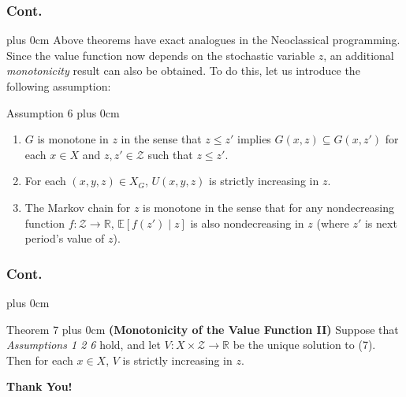 \documentclass[10pt]{beamer}
\renewcommand{\raggedright}{\leftskip=0pt \rightskip=0pt plus 0cm}
\begin{document}
\begin{frame}[c]\frametitle{Cont.}
		\raggedright
  Above theorems have exact analogues in the Neoclassical programming. Since the value function now depends
on the stochastic variable $z$, an additional \textit{monotonicity} result can also be obtained. To do this, let us introduce the following assumption:
\begin{block}{Assumption 6}
\raggedright
\begin{enumerate}
    \item \( G \) is monotone in \( z \) in the sense that \( z \leq z' \) implies \( G(x, z) \subseteq G(x, z') \) for each \( x \in X \) and \( z, z' \in \mathcal{Z} \) such that \( z \leq z' \).
    \item For each \( (x, y, z) \in X_G \), \( U(x, y, z) \) is strictly increasing in \( z \).
    \item The Markov chain for \( z \) is monotone in the sense that for any nondecreasing function \( f : \mathcal{Z} \to \mathbb{R} \), \( \mathbb{E}[f(z') \mid z] \) is also nondecreasing in \( z \) (where \( z' \) is next period's value of \( z \)).
\end{enumerate}
\end{block}
\end{frame}
\begin{frame}[c]\frametitle{Cont.}
		\raggedright
\begin{block}{Theorem 7}
\raggedright
   \textbf{(Monotonicity of the Value Function II)} Suppose that \textit{Assumptions 1 2 6} hold, and let \( V : X \times \mathcal{Z} \to \mathbb{R} \) be the unique solution to (7). Then for each \( x \in X \), \( V \) is strictly increasing in \( z \).
\end{block}
\end{frame}
\begin{frame}[plain]
\begin{center}
	\textbf{	Thank You!}
\end{center}
	\end{frame}
\end{document}
